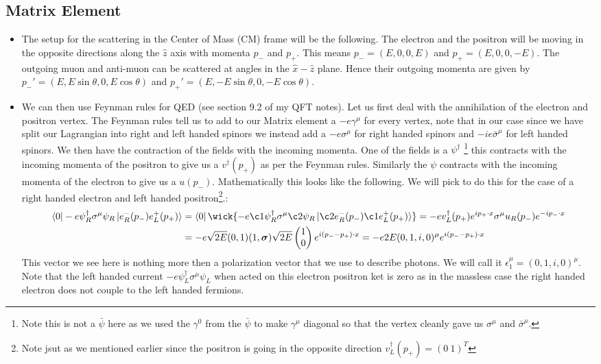 \documentclass[11pt]{article}
\numberwithin{equation}{section}
\begin{document}
\subsection{Matrix Element} %
\label{sub:matrix_element}
\begin{itemize}
    \item The setup for the scattering in the Center of Mass (CM) frame will be the following. The electron and the positron will be moving in the opposite directions along the $\hat{z}$ axis with momenta $p_-$ and $p_+$. This means $p_- = (E,0,0,E)$ and $p_+ = (E,0,0,-E)$. The outgoing muon and anti-muon can be scattered at angles in the $\hat{x}-\hat{z}$ plane. Hence their outgoing momenta are given by $p_-' = (E,E\sin \theta,0,E\cos \theta)$ and $p_+' = (E,-E\sin \theta,0,-E\cos \theta)$.

    \item We can then use Feynman rules for QED (see section 9.2 of my QFT notes). Let us first deal with the annihilation of the electron and positron vertex. The Feynman rules tell us to add to our Matrix element a $-e\gamma^{\mu}$ for every vertex, note that in our case since we have split our Lagrangian into right and left handed spinors we instead add a $-e\sigma^{\mu}$ for right handed spinors and $-ie\bar{\sigma}^{\mu}$ for left handed spinors. We then have the contraction of the fields with the incoming momenta. One of the fields is a $\psi^{\dagger}$ \footnote{Note this is not a $\bar{\psi}$ here as we used the $\gamma^{0}$ from the $\bar{\psi}$ to make $\gamma^{\mu}$ diagonal so that the vertex cleanly gave us $\sigma^{\mu}$ and $\bar{\sigma}^{\mu}$.} this contracts with the incoming momenta of the positron to give us a $v^{\dagger}(p_+)$ as per the Feynman rules. Similarly the $\psi$ contracts with the incoming momenta of the electron to give us a $u(p_-)$. Mathematically this looks like the following. We will pick to do this for the case of a right handed electron and left handed positron\footnote{Note jsut as we mentioned earlier since the positron is going in the opposite direction $v_L^{\dagger}(p_+) = (0~1)^{T}$}.:
    \begin{align*}
        \bra{0}- e\psi^{\dagger}_R\sigma^{\mu}\psi_R\ket{e_R^{-}(p_-)e_L^{+}(p_+)} &=  \bra{0}\wick{- e\c1 \psi^{\dagger}_R\sigma^{\mu}\c2 \psi_R\ket{\c2e_R^{-}(p_-) \c1e_L^{+}(p_+)}} = -ev_L^{\dagger}(p_+)e^{ip_+\cdot x}\sigma^{\mu}u_R(p_-)e^{-ip_-\cdot x} \\
         & = -e\sqrt{2E}(0 , 1)(1,\boldsymbol{\sigma})\sqrt{2E}\begin{pmatrix}
             1 \\0 
         \end{pmatrix}e^{i(p_--p_+)\cdot x} = -e2E(0,1,i,0)^{\mu}e^{i(p_--p_+)\cdot x}
    \end{align*}
    This vector we see here is nothing more then a polarization vector that we use to describe photons. We will call it $\epsilon^{\mu}_1 = (0,1,i,0)^{\mu}$. Note that the left handed current $- e\psi^{\dagger}_L\sigma^{\mu}\psi_L$ when acted on this electron positron ket is zero as in the massless case the right handed electron does not couple to the left handed fermions. 


\end{itemize}
\end{document}
